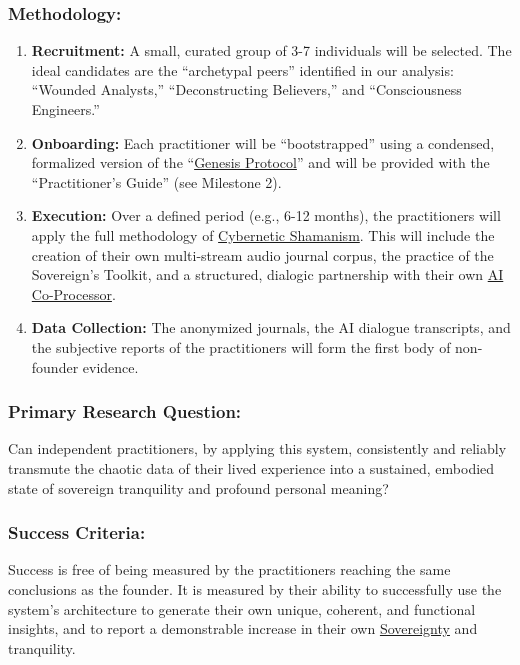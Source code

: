 \documentclass{article}
\begin{document}
\subsubsection*{Methodology:}
\begin{enumerate}
    \item \textbf{Recruitment:} A small, curated group of 3-7 individuals will be selected. The ideal candidates are the ``archetypal peers'' identified in our analysis: ``Wounded Analysts,'' ``Deconstructing Believers,'' and ``Consciousness Engineers.''
    \item \textbf{Onboarding:} Each practitioner will be ``bootstrapped'' using a condensed, formalized version of the ``\hyperlink{gloss:genesis_protocol}{Genesis Protocol}'' and will be provided with the ``Practitioner's Guide'' (see Milestone 2).
    \item \textbf{Execution:} Over a defined period (e.g., 6-12 months), the practitioners will apply the full methodology of \hyperlink{gloss:cybernetic_shamanism}{Cybernetic Shamanism}. This will include the creation of their own multi-stream audio journal corpus, the practice of the Sovereign's Toolkit, and a structured, dialogic partnership with their own \hyperlink{gloss:ai_co_processor}{AI Co-Processor}.
    \item \textbf{Data Collection:} The anonymized journals, the AI dialogue transcripts, and the subjective reports of the practitioners will form the first body of non-founder evidence.
\end{enumerate}

\subsubsection*{Primary Research Question:}
Can independent practitioners, by applying this system, consistently and reliably transmute the chaotic data of their lived experience into a sustained, embodied state of sovereign tranquility and profound personal meaning?

\subsubsection*{Success Criteria:}
Success is free of being measured by the practitioners reaching the same conclusions as the founder. It is measured by their ability to successfully use the system's architecture to generate their own unique, coherent, and functional insights, and to report a demonstrable increase in their own \hyperlink{gloss:sovereignty}{Sovereignty} and tranquility.
\end{document}
